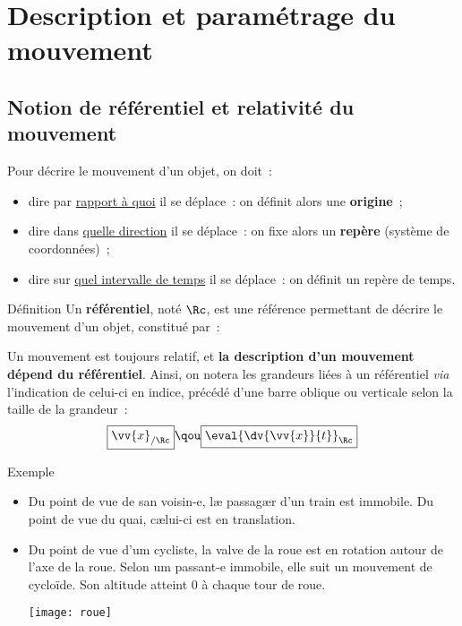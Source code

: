 \documentclass[../main/main.tex]{subfiles}
\begin{document}
\section{Description et paramétrage du mouvement}
\subsection{Notion de référentiel et relativité du mouvement}

Pour décrire le mouvement d'un objet, on doit~:
\begin{itemize}
    \item dire par \underline{rapport à quoi} il se déplace~: on définit alors
        une \textbf{origine}~;
    \item dire dans \underline{quelle direction} il se déplace~: on fixe alors
        un \textbf{repère} (système de coordonnées)~;
    \item dire sur \underline{quel intervalle de temps} il se déplace~: on
        définit un repère de temps.
\end{itemize}

\begin{bdefi}{Définition}
    Un \textbf{référentiel}, noté $\Rc$, est une référence permettant de décrire
    le mouvement d'un objet, constitué par~:
\end{bdefi}

Un mouvement est toujours relatif, et \textbf{la description d'un mouvement
dépend du référentiel}. Ainsi, on notera les grandeurs liées à un référentiel
\textit{via} l'indication de celui-ci en indice, précédé d'une barre oblique ou
verticale selon la taille de la grandeur~:
\[  \boxed{\vv{x}_{/\Rc}}
    \qou
    \boxed{\eval{\dv{\vv{x}}{t}}_{\Rc}}\]

\begin{rexem}{Exemple}
    \begin{itemize}
        \item Du point de vue de san voisin-e, læ passagær d'un train est
            immobile. Du point de vue du quai, cælui-ci est en translation.
        \item Du point de vue d'um cycliste, la valve de la roue est en rotation
            autour de l'axe de la roue. Selon um passant-e immobile, elle suit
            un mouvement de cycloïde. Son altitude atteint $0$ à chaque tour de
            roue.
            \begin{center}
                \texttt{[image: roue]}
            \end{center}
    \end{itemize}
\end{rexem}
\end{document}
